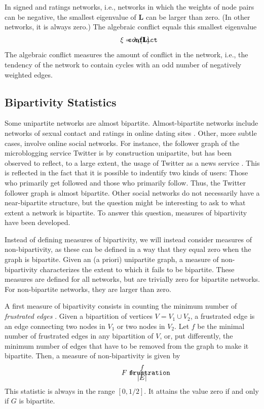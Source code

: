 \documentclass{article}
\def\mathnote#1{%
  \tag*{\rlap{\hspace\marginparsep\smash{\parbox[t]{\marginparwidth}{#1}}}}
}
\begin{document}
In signed and ratings networks, i.e., networks in which the weights of
node pairs can be negative, the smallest eigenvalue of $\mathbf L$ can
be larger than zero.  (In other networks, it is always zero.) The
algebraic conflict equals this smallest eigenvalue
\begin{align}
  \mathnote{\texttt{conflict}} \xi &= \lambda_1[\mathbf L].
\end{align}
The algebraic conflict measures the amount of conflict in the network,
i.e., the tendency of the network to contain cycles with an odd number
of negatively weighted edges.

\subsection{Bipartivity Statistics}
Some unipartite networks are almost bipartite.  Almost-bipartite
networks include networks of sexual contact \citep{b719} and ratings in
online dating sites \citep{b311,kunegis:split-complex-dating}.  Other,
more subtle cases, involve online social networks.  For instance, the
follower graph of the microblogging service Twitter is by construction
unipartite, but has been observed to reflect, to a large extent, the
usage of Twitter as a news service \citep{b545}. This is reflected in the
fact that it is possible to indentify two kinds of users: Those who
primarily get followed and those who primarily follow.  Thus, the
Twitter follower graph is almost bipartite.  Other social networks do
not necessarily have a near-bipartite structure, but the question might
be interesting to ask to what extent a network is bipartite.  To answer
this question, measures of bipartivity have been developed.

Instead of defining measures of bipartivity, we will instead consider
measures of non-bipartivity, as these can be defined in a way that they
equal zero when the graph is bipartite.  Given an (a priori) unipartite
graph, a measure of non-bipartivity characterizes the extent to which it
fails to be bipartite.  These measures are defined for all networks, but
are trivially zero for bipartite networks.  For non-bipartite networks,
they are larger than zero.

A first measure of bipartivity consists in counting the minimum number
of \emph{frustrated edges} \citep{b531}. Given a bipartition of vertices
$V=V_1\cup V_2$, a frustrated edge is an edge connecting two nodes in
$V_1$ or two nodes in $V_2$.  Let $f$ be the minimal number of
frustrated edges in any bipartition of $V$, or, put differently, the
minimum number of edges that have to be removed from the graph to make
it bipartite.  Then, a measure of non-bipartivity is given by
\begin{align}
  \mathnote{\texttt{frustration}} F &= \frac f {|E|}.
\end{align}
This statistic is always in the range $[0, 1/2]$.  It attains the value
zero if and only if $G$ is bipartite.
\end{document}

